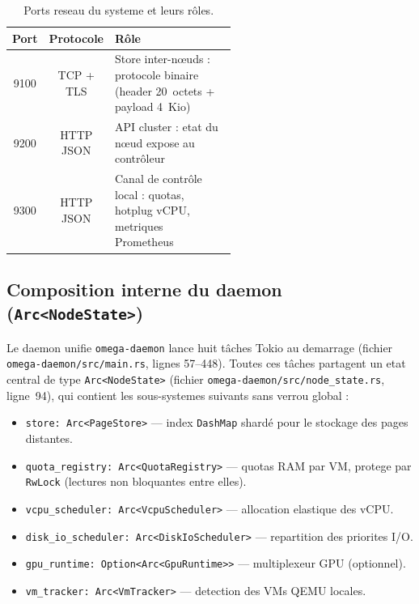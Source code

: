 \begin{table}[htbp]
    \centering
    \caption{Ports reseau du systeme et leurs rôles.}
    \label{tab:ports-reseau}
    \begin{tabular}{c c p{0.55\linewidth}}
        \toprule
        \textbf{Port} & \textbf{Protocole} & \textbf{R\^ole} \\
        \midrule
        9100 & TCP + TLS & Store inter-nœuds : protocole binaire (header 20~octets + payload 4~Kio) \\
        9200 & HTTP JSON & API cluster : etat du nœud expose au contrôleur \\
        9300 & HTTP JSON & Canal de contrôle local : quotas, hotplug vCPU, metriques Prometheus \\
        \bottomrule
    \end{tabular}
\end{table}

\subsection{Composition interne du daemon (\texttt{Arc<NodeState>})}
\label{subsec:composition-daemon}

Le daemon unifie \texttt{omega-daemon} lance huit tâches Tokio au demarrage (fichier \texttt{omega-daemon/src/main.rs}, lignes 57--448). Toutes ces tâches partagent un etat central de type \texttt{Arc<NodeState>} (fichier \texttt{omega-daemon/src/node\_state.rs}, ligne~94), qui contient les sous-systemes suivants sans verrou global :

\begin{itemize}
    \item \texttt{store: Arc<PageStore>} --- index \texttt{DashMap} shardé pour le stockage des pages distantes.
    \item \texttt{quota\_registry: Arc<QuotaRegistry>} --- quotas RAM par VM, protege par \texttt{RwLock} (lectures non bloquantes entre elles).
    \item \texttt{vcpu\_scheduler: Arc<VcpuScheduler>} --- allocation elastique des vCPU.
    \item \texttt{disk\_io\_scheduler: Arc<DiskIoScheduler>} --- repartition des priorites I/O.
    \item \texttt{gpu\_runtime: Option<Arc<GpuRuntime>>} --- multiplexeur GPU (optionnel).
    \item \texttt{vm\_tracker: Arc<VmTracker>} --- detection des VMs QEMU locales.
\end{itemize}

